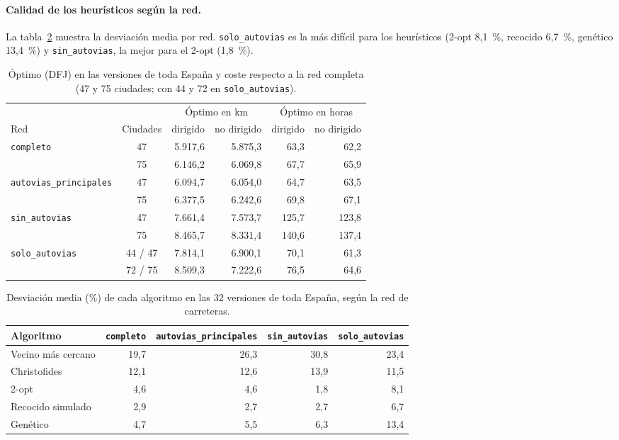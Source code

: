 \paragraph{Calidad de los heurísticos según la red.} La tabla~\ref{tab:gapred} muestra la desviación media por red. \texttt{solo\_autovias} es la más difícil para los heurísticos (2-opt 8,1~\%, recocido 6,7~\%, genético 13,4~\%) y \texttt{sin\_autovias}, la mejor para el 2-opt (1,8~\%).

\begin{table}[htbp]
  \centering
  \caption{Óptimo (DFJ) en las versiones de toda España y coste respecto a la red completa (47 y 75 ciudades; con 44 y 72 en \texttt{solo\_autovias}).}\label{tab:optimos}
  \footnotesize
  \begin{tabular}{@{}l c r r r r@{}}
    \toprule
    & & \multicolumn{2}{c}{Óptimo en km} & \multicolumn{2}{c}{Óptimo en horas} \\
    \cmidrule(lr){3-4}\cmidrule(lr){5-6}
    Red & Ciudades & dirigido & no dirigido & dirigido & no dirigido \\
    \midrule
    \texttt{completo} & 47 & 5.917,6 & 5.875,3 & 63,3 & 62,2 \\
    & 75 & 6.146,2 & 6.069,8 & 67,7 & 65,9 \\
    \texttt{autovias\_principales} & 47 & 6.094,7 & 6.054,0 & 64,7 & 63,5 \\
    & 75 & 6.377,5 & 6.242,6 & 69,8 & 67,1 \\
    \texttt{sin\_autovias} & 47 & 7.661,4 & 7.573,7 & 125,7 & 123,8 \\
    & 75 & 8.465,7 & 8.331,4 & 140,6 & 137,4 \\
    \texttt{solo\_autovias} & 44 / 47 & 7.814,1 & 6.900,1 & 70,1 & 61,3 \\
    & 72 / 75 & 8.509,3 & 7.222,6 & 76,5 & 64,6 \\
    \bottomrule
  \end{tabular}
\end{table}

\begin{table}[htbp]
  \centering
  \caption{Desviación media (\%) de cada algoritmo en las 32 versiones de toda España, según la red de carreteras.}\label{tab:gapred}
  \small
  \begin{tabular}{@{}l r r r r@{}}
    \toprule
    Algoritmo & \texttt{completo} & \texttt{autovias\_principales} & \texttt{sin\_autovias} & \texttt{solo\_autovias} \\
    \midrule
    Vecino más cercano & 19,7 & 26,3 & 30,8 & 23,4 \\
    Christofides & 12,1 & 12,6 & 13,9 & 11,5 \\
    2-opt & 4,6 & 4,6 & 1,8 & 8,1 \\
    Recocido simulado & 2,9 & 2,7 & 2,7 & 6,7 \\
    Genético & 4,7 & 5,5 & 6,3 & 13,4 \\
    \bottomrule
  \end{tabular}
\end{table}

